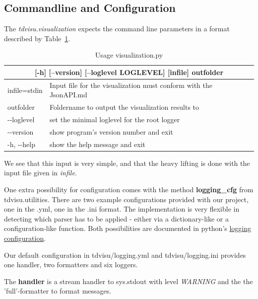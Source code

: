 \documentclass[a4paper, 12pt, bibliography=totoc]{scrartcl}
\begin{document}

\subsection{Commandline and Configuration}

The \textit{tdvisu.visualization} expects the command line parameters in a format described by Table~\ref{tab:optionstdvisu}.

\def\arraystretch{1.2}%
\begin{longtable}{|ll|}
	\caption{Usage visualization.py 
		\label{tab:optionstdvisu}}\\
	\hline 
	\multicolumn{2}{|c|}{[-h] [--version] [--loglevel LOGLEVEL] [infile] outfolder}
	\\[2ex]
	\endfirsthead

	infile=stdin &  Input file for the visualization must conform with the JsonAPI.md\\
	outfolder &  Foldername to output the visualization results to\\
	-{}-loglevel  &   set the minimal loglevel for the root logger\\
	-{}-version & show program's version number and exit\\
	-h, -{}-help & show the help message and exit\\
	\hline
\end{longtable}

We see that this input is very simple, and that the heavy lifting is done with the input file given in \textit{infile}.

One extra possibility for configuration comes with the method \textbf{logging\_cfg} from {tdvisu.utilities}. There are two example configurations provided with our project, one in the .yml, one in the .ini format. The implementation is very flexible in detecting which parser has to be applied - either via a dictionary-like or a configuration-like function. Both possibilities are documented in python's \href{https://docs.python.org/3/library/logging.config.html#logging-config-api}{logging configuration}.

Our default configuration in tdvisu/logging.yml and tdvisu/logging.ini provides one handler, two formatters and six loggers.

The \textbf{handler} is a stream handler to sys.stdout with level \textit{WARNING} and the the 'full'-formatter to format messages.
\end{document}

